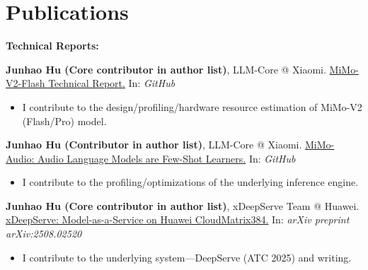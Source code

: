 \section{Publications}


\textbf{Technical Reports:}
\begin{enumerate}[label={[\arabic*]}]

    \item \textbf{Junhao Hu (Core contributor in author list)}, LLM-Core @ Xiaomi. \href{https://github.com/XiaomiMiMo/MiMo-V2-Flash/blob/main/paper.pdf}{\color{cyan} MiMo-V2-Flash Technical Report.} In: \textit{GitHub}
    \begin{itemize}
        \item I contribute to the design/profiling/hardware resource estimation of MiMo-V2 (Flash/Pro) model.
    \end{itemize}

    \item \textbf{Junhao Hu (Contributor in author list)}, LLM-Core @ Xiaomi. \href{https://github.com/XiaomiMiMo/MiMo-Audio/blob/main/MiMo-Audio-Technical-Report.pdf}{\color{cyan} MiMo-Audio: Audio Language Models are Few-Shot Learners.} In: \textit{GitHub}
    \begin{itemize}
        \item I contribute to the profiling/optimizations of the underlying inference engine.
    \end{itemize}
    
    \item \textbf{Junhao Hu (Core contributor in author list)}, xDeepServe Team @ Huawei. \href{https://arxiv.org/pdf/2508.02520}{\color{cyan} xDeepServe: Model-as-a-Service on Huawei CloudMatrix384.} In: \textit{arXiv preprint arXiv:2508.02520}
    \begin{itemize}
        \item I contribute to the underlying system---DeepServe (ATC 2025) and writing.\\
    \end{itemize}
\end{enumerate}

